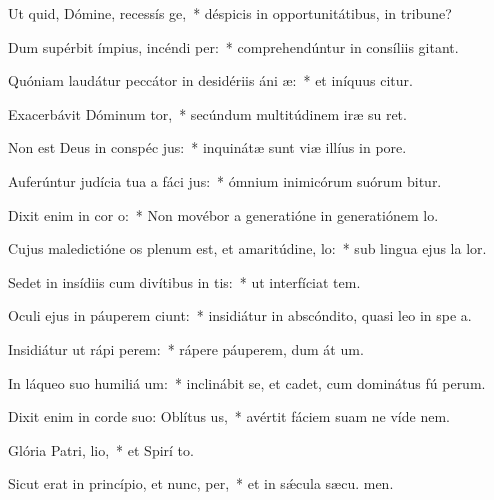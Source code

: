 \item Ut quid, Dómine, recessís ge,~* déspicis in opportunitátibus, in tribune?
\item Dum supérbit ímpius, incéndi per:~* comprehendúntur in consíliis  gitant.
\item Quóniam laudátur peccátor in desidériis áni æ:~* et iníquus citur.
\item Exacerbávit Dóminum tor,~* secúndum multitúdinem iræ su  ret.
\item Non est Deus in conspéc jus:~* inquinátæ sunt viæ illíus in  pore.
\item Auferúntur judícia tua a fáci jus:~* ómnium inimicórum suórum bitur.
\item Dixit enim in cor o:~* Non movébor a generatióne in generatiónem  lo.
\item Cujus maledictióne os plenum est, et amaritúdine,  lo:~* sub lingua ejus la  lor.
\item Sedet in insídiis cum divítibus in tis:~* ut interfíciat tem.
\item Oculi ejus in páuperem ciunt:~* insidiátur in abscóndito, quasi leo in spe a.
\item Insidiátur ut rápi perem:~* rápere páuperem, dum át um.
\item In láqueo suo humiliá um:~* inclinábit se, et cadet, cum dominátus fú perum.
\item Dixit enim in corde suo: Oblítus  us,~* avértit fáciem suam ne víde  nem.
\item Glória Patri,  lio,~* et Spirí to.
\item Sicut erat in princípio, et nunc,  per,~* et in sǽcula sæcu. men.

